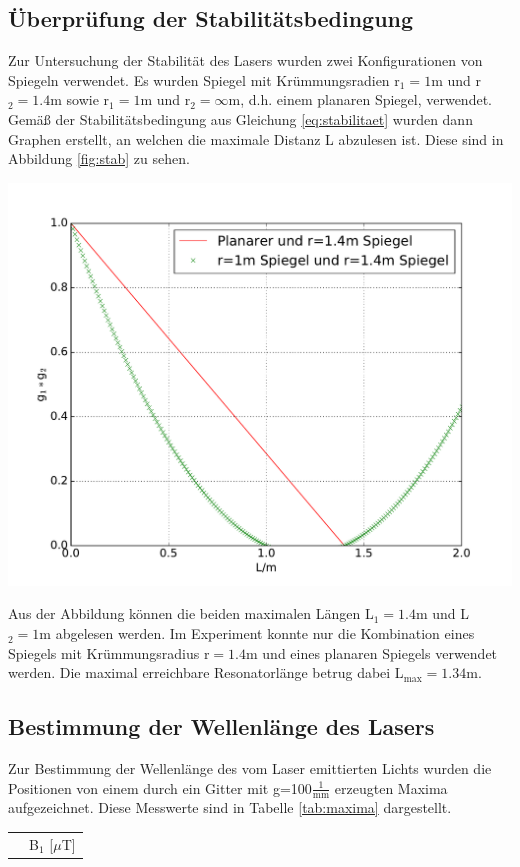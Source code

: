 \documentclass[]{scrartcl}
\begin{document}
\subsection{Überprüfung der Stabilitätsbedingung}
Zur Untersuchung der Stabilität des Lasers wurden zwei Konfigurationen von Spiegeln verwendet. Es wurden Spiegel mit Krümmungsradien r$_1=1\si{\meter}$ und r$_2=1.4\si{\meter}$ sowie r$_1=1\si{\meter}$ und r$_2=\infty\si{\meter}$, d.h. einem planaren Spiegel, verwendet. \\
Gemäß der Stabilitätsbedingung aus Gleichung \ref{eq:stabilitaet} wurden dann Graphen erstellt, an welchen die maximale Distanz L abzulesen ist. Diese sind in Abbildung \ref{fig:stab} zu sehen. \\
\begin{center}
	\includegraphics[width=\textwidth]{images/vorbereitung.pdf}
	\label{fig:stab}
\end{center}
Aus der Abbildung können die beiden maximalen Längen L$_1=1.4\si{\meter}$ und L$_2=1\si{\metre}$ abgelesen werden. Im Experiment konnte nur die Kombination eines Spiegels mit Krümmungsradius r$=1.4\si{\metre}$ und eines planaren Spiegels verwendet werden. Die maximal erreichbare Resonatorlänge betrug dabei L$_{\text{max}}=1.34\si{\meter}$.

\subsection{Bestimmung der Wellenlänge des Lasers}
Zur Bestimmung der Wellenlänge des vom Laser emittierten Lichts wurden die Positionen von einem durch ein Gitter mit g=100$\frac{1}{\si{\milli\metre}}$ erzeugten Maxima aufgezeichnet. Diese Messwerte sind in Tabelle \ref{tab:maxima} dargestellt. \\
\begin{center}
	\begin{tabular}{|c|c|}
		\hline  & B$_1$ [$\mu$T] \\

	\end{tabular}
	\label{tab:mmaxima}
\end{center}
\end{document}
